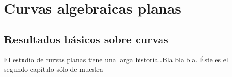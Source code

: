 \documentclass[11pt, twoside]{book}
\begin{document}
\chapter{Curvas algebraicas planas}

\section{Resultados básicos sobre curvas}
El estudio de curvas planas tiene una larga historia\ldots Bla bla bla. Éste es
el segundo capítulo sólo de muestra
\end{document}
